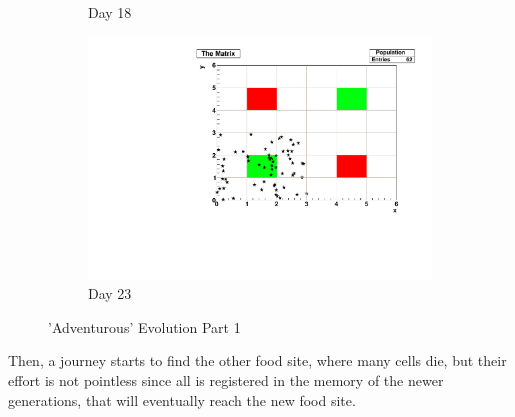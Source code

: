 \documentclass[a4paper,prd,twocolumn,nofootinbib,superscriptaddress,floatfix]{revtex4}
\begin{document}
\begin{figure}[H]
\begin{subfigure}[b]{0.5\linewidth}
    \caption{Day 18} 
    \label{fig:6b} 
    \vspace{4ex}
  \end{subfigure} 
  \begin{subfigure}[b]{\linewidth}
    \centering
    \includegraphics[width=0.6\linewidth]{a_23.pdf} 
    \caption{Day 23} 
    \label{fig:6c} 
  \end{subfigure}%
  \caption{'Adventurous' Evolution Part 1}
  \label{fig:6} 
\end{figure}

 Then, a journey starts to find the other food site, where many cells die, but their effort is not pointless since all is registered in the memory of the newer generations, that will eventually reach the new food site.

\setcounter{figure}{5}
\end{document}
